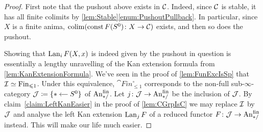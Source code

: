 \begin{proof}%
	First note that the pushout above exists in $\mathcal{C}$. Indeed, since $\mathcal{C}$ is stable, it has all finite colimits by \cref{lem:Stable}\cref{enum:PushoutPullback}. In particular, since $X$ is a finite anima, $\operatorname*{colim}(\operatorname{const} F(S^0)\colon X\rightarrow \mathcal{C})$ exists, and then so does the pushout.
	
	Showing that $\operatorname{Lan}_iF(X,x)$ is indeed given by the pushout in question is essentially a lengthy unravelling of the Kan extension formula from \cref{lem:KanExtensionFormula}. We've seen in the proof of \cref{lem:FunExcIsSp} that $\mathcal{I}\simeq \mathrm{Fin}_{\leqslant 1}$. Under this equivalence, $\cat{Fin}_{\leqslant1}^\circ$ corresponds to the non-full sub-$\infty$-category $\Jj\coloneqq \{\begin{tikzcd}[cramped, column sep=small,ampersand replacement=\&]*\&\lar S^0\end{tikzcd}\}$ of $\FinAn$. Let $j\colon \Jj\rightarrow \FinAn$ be the inclusion of $\mathcal{J}$. By claim~\cref{claim:LeftKanEasier} in the proof of \cref{lem:CGrpIsC} we may replace $\mathcal{I}$ by $\mathcal{J}$ and analyse the left Kan extension $\operatorname{Lan}_jF$ of a reduced functor $F\colon \Jj\rightarrow \FinAn$ instead. This will make our life much easier.
	

\end{proof}
